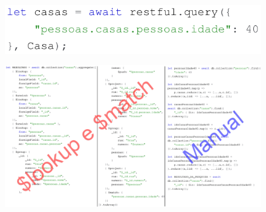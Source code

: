 \documentclass{beamer} %
\begin{document}
\begin{frame}
    \begin{figure}
        \centering
        \includegraphics[width=\linewidth]{imagens/query-alpha-restful.png}
        \label{fig:query-alpha-restful}
    \end{figure}
    
    \vspace*{-0.7cm}
    \pause
    
    \begin{figure}
        \centering
        \includegraphics[width=\linewidth]{imagens/compare-others.png}
        \label{fig:compare-others}
    \end{figure}
\end{frame}
\end{document}
